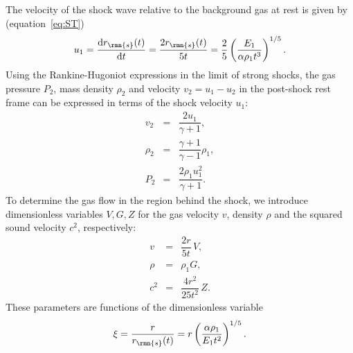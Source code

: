 \documentclass[8pt,a4paper,usenatbib]{mnras}
\newcommand{\de}{\mathrm{d}}
\begin{document}
The velocity of the shock wave relative to the background gas at rest is given
by (equation~\ref{eq:ST})
\begin{equation}
  u_1 = \dfrac{\de r_{\rmn{s}} (t)}{\de t} = \dfrac{2r_{\rmn{s}} (t)}{5t} =
  \dfrac{2}{5} \left(\dfrac{E_1}{\alpha \rho_1 t^3}\right)^{1/5}.
\end{equation}
Using the Rankine-Hugoniot expressions in the limit of strong shocks, the gas
pressure $P_2$, mass density $\rho_2$ and velocity $v_2 = u_1 - u_2$ in the
post-shock rest frame can be expressed in terms of the shock velocity $u_1$:
\begin{eqnarray}
\label{eq:v2}
v_2 &=& \dfrac{2 u_1}{\gamma+1} ,\\
\label{eq:rho2}
\rho_2 &=& \dfrac{\gamma+1}{\gamma-1} \rho_1,\\
\label{eq:P2}
P_2 &=& \dfrac{2 \rho_1 u_1^2}{\gamma+1}.
\end{eqnarray}
To determine the gas flow in the region behind the shock, we introduce dimensionless
variables $V,G,Z$ for the gas velocity $v$, density $\rho$ and the squared sound
velocity $c^2$, respectively:
\begin{eqnarray}
\label{eq:vV}
v &=& \dfrac{2r}{5t}\,V  ,\\
\label{eq:rG}
  \rho &=& \rho_1 G  ,\\
\label{eq:PZ}
c^2 &=& \dfrac{4r^2}{25 t^2}\,Z .
\end{eqnarray}
These parameters are functions of the dimensionless variable
\begin{eqnarray}
\xi = \dfrac{r}{r_{\rmn{s}}(t)} = r \left(\dfrac{\alpha \rho_1}{E_1 t^2} \right)^{1/5} .
\end{eqnarray}
\end{document}
